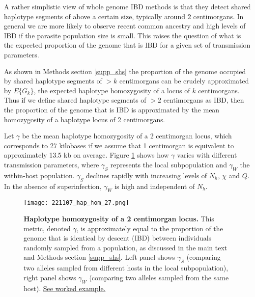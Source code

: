 \documentclass[_main.tex]{subfiles}
\begin{document}
A rather simplistic view of whole genome IBD methods is that they detect shared haplotype segments of above a certain size, typically around 2 centimorgans.   In general we are more likely to observe recent common ancestry and high levels of IBD if the parasite population size is small.  This raises the question of what is the expected proportion of the genome that is IBD for a given set of transmission parameters.

As shown in Methods section \ref{supp_shs} the proportion of the genome occupied by shared haplotype segments of $>k$ centimorgans can be crudely approximated by $E \{G_k \}$, the expected haplotype homozygosity of a locus of $k$ centimorgans.  Thus if we define shared haplotype segments of $>2$ centimorgans as IBD, then the proportion of the genome that is IBD is approximated by the mean homozygosity of a haplotype locus of 2 centimorgans.

Let $\gamma$ be the mean haplotype homozygosity of a 2 centimorgan locus, which corresponds to 27 kilobases if we assume that 1 centimorgan is equivalent to approximately 13.5 kb on average.  Figure \ref{fig:main_hap_hom_27} shows how $\gamma$ varies with different transmission parameters, where $\gamma_S$ represents the local subpopulation and $\gamma_W$ the within-host population.  $\gamma_S$ declines rapidly with increasing levels of $N_h$, $\chi$ and $Q$.  In the absence of superinfection, $\gamma_W$ is high and independent of $N_h$. 

\begin{figure}[h!]
\centering
\texttt{[image: 221107\_hap\_hom\_27.png]}
\caption{\textbf{Haplotype homozygosity of a 2 centimorgan locus.} This metric, denoted $\gamma$, is approximately equal to the proportion of the genome that is identical by descent (IBD) between individuals randomly sampled from a population, as discussed in the main text and Methods section \ref{supp_shs}.  Left panel shows $\gamma_S$ (comparing two alleles sampled from different hosts in the local subpopulation), right panel shows $\gamma_W$ (comparing two alleles sampled from the same host).   \href{https://d-kwiat.github.io/gtg/ibd.html}{See worked example.}}
\label{fig:main_hap_hom_27}
\end{figure}

\end{document}
